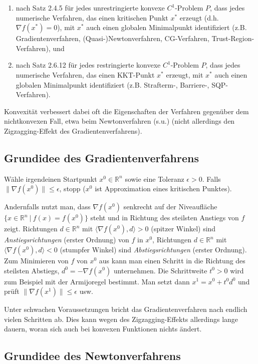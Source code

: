 \documentclass[12pt]{extreport} %
\newcommand{\R}{\mathbb{R}}
\theoremstyle{named}
\theoremstyle{nnamed}
\theoremstyle{itshape}
\theoremstyle{normal}
\begin{document}
\begin{enumerate}
	\item nach Satz 2.4.5 für jedes unrestringierte konvexe $C^1$-Problem $P$, dass jedes numerische Verfahren, das einen kritischen Punkt $x^*$ erzeugt (d.h. $\nabla f(x^*) = 0$), mit $x^*$ auch einen globalen Minimalpunkt identifiziert (z.B. Gradientenverfahren, (Quasi-)Newtonverfahren, CG-Verfahren, Trust-Region-Verfahren), und
	\item nach Satz 2.6.12 für jedes restringierte konvexe $C^1$-Problem $P$, dass jedes numerische Verfahren, das einen KKT-Punkt $x^*$ erzeugt, mit $x^*$ auch einen globalen Minimalpunkt identifiziert (z.B. Strafterm-, Barriere-, SQP-Verfahren).
\end{enumerate}

Konvexität verbessert dabei oft die Eigenschaften der Verfahren gegenüber dem nichtkonvexen Fall, etwa beim Newtonverfahren (s.u.) (nicht allerdings den Zigzagging-Effekt des Gradientenverfahrens).

\subsection*{Grundidee des Gradientenverfahrens}

Wähle irgendeinen Startpunkt $x^0 \in \R^n$ sowie eine Toleranz $\epsilon > 0$. Falls $\| \nabla f(x^0) \| \leq \epsilon$, stopp ($x^0$ ist Approximation eines kritischen Punktes). ~\bigskip

Andernfalls nutzt man, dass $\nabla f(x^0)$ senkrecht auf der Niveaufläche $\{ x \in \R^n ~|~f(x) = f(x^0) \}$ steht und in Richtung des steilsten Anstiegs von $f$ zeigt. Richtungen $d \in \R^n$ mit $\langle \nabla f(x^0) , d \rangle > 0$ (spitzer Winkel) sind \textit{Anstiegsrichtungen} (erster Ordnung) von $f$ in $x^0$, Richtungen $d \in \R^n$ mit $\langle \nabla f(x^0), d \rangle < 0$ (stumpfer Winkel) sind \textit{Abstiegsrichtungen} (erster Ordnung). Zum Minimieren von $f$ von $x^0$ aus kann man einen Schritt in die Richtung des steilsten Abstiegs, $d^0 = -\nabla f(x^0)$ unternehmen. Die Schrittweite $t^0 > 0$ wird zum Beispiel mit der Armijoregel bestimmt. Man setzt dann $x^1 = x^0 + t^0 d^0$ und prüft $\| \nabla f(x^1) \| \leq \epsilon$ usw. ~\bigskip
	
Unter schwachen Voraussetzungen bricht das Gradientenverfahren nach endlich vielen Schritten ab. Dies kann wegen des Zigzagging-Effekts allerdings lange dauern, woran sich auch bei konvexen Funktionen nichts ändert.

\subsection*{Grundidee des Newtonverfahrens}	
	
\end{document}
